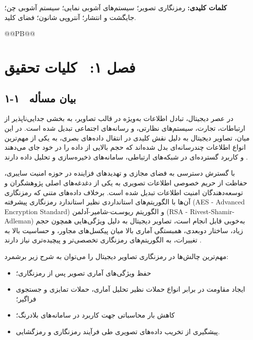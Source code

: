 \textbf{کلمات کلیدی:} رمزنگاری تصویر؛ سیستم‌های آشوبی نمایی؛ سیستم آشوبی چن؛ جایگشت و انتشار؛ آنتروپی شانون؛ فضای کلید.



@@PB@@








\chapter{فصل ۱:  کلیات تحقیق}
\section{۱-۱  بيان مسأله}

در عصر دیجیتال، تبادل اطلاعات به‌ویژه در قالب تصاویر، به بخشی جدایی‌ناپذیر از ارتباطات، تجارت، سیستم‌های نظارتی، و رسانه‌های اجتماعی تبدیل شده است. در این میان، تصاویر دیجیتال به دلیل نقش کلیدی در انتقال داده‌های بصری، به یکی از مهم‌ترین انواع اطلاعات چندرسانه‌ای بدل شده‌اند که حجم بالایی از داده را در خود جای می‌دهند و کاربرد گسترده‌ای در شبکه‌های ارتباطی، سامانه‌های ذخیره‌سازی و تحلیل داده دارند \cite{ref1}.

با گسترش دسترسی به فضای مجازی و تهدیدهای فزاینده در حوزه امنیت سایبری، حفاظت از حریم خصوصی اطلاعات تصویری به یکی از دغدغه‌های اصلی پژوهشگران و توسعه‌دهندگان امنیت اطلاعات تبدیل شده است. برخلاف داده‌های متنی که رمزنگاری آن‌ها با الگوریتم‌های استانداردی نظیر استاندارد رمزنگاری پیشرفته (‎AES - Advanced Encryption Standard‎) و الگوریتم ریوسـت-شامیر-آدلمن (‎RSA - Rivest-Shamir-Adleman‎) به‌خوبی قابل انجام است، تصاویر دیجیتال به دلیل ویژگی‌هایی همچون حجم زیاد، ساختار دوبعدی، همبستگی آماری بالا میان پیکسل‌های مجاور، و حساسیت بالا به تغییرات، به الگوریتم‌های رمزنگاری تخصصی‌تر و پیچیده‌تری نیاز دارند \cite{ref2, ref3}.

مهم‌ترین چالش‌ها در رمزنگاری تصاویر دیجیتال را می‌توان به شرح زیر برشمرد:

\begin{itemize}
    \item حفظ ویژگی‌های آماری تصویر پس از رمزنگاری؛
    \item ایجاد مقاومت در برابر انواع حملات نظیر تحلیل آماری، حملات تمایزی و جستجوی فراگیر؛
    \item کاهش بار محاسباتی جهت کاربرد در سامانه‌های بلادرنگ؛
    \item پیشگیری از تخریب داده‌های تصویری طی فرآیند رمزنگاری و رمزگشایی.
\end{itemize}

